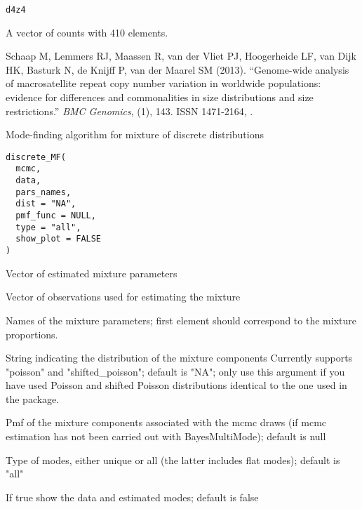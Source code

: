 \documentclass[a4paper]{book}
\begin{document}
%
\begin{Usage}
\begin{verbatim}
d4z4
\end{verbatim}
\end{Usage}
%
\begin{Format}
A vector of counts with 410 elements.
\end{Format}
%
\begin{References}\relax
Schaap M, Lemmers RJ, Maassen R, van der Vliet PJ, Hoogerheide LF, van Dijk HK, Basturk N, de Knijff P, van der Maarel SM (2013).
``Genome-wide analysis of macrosatellite repeat copy number variation in worldwide populations: evidence for differences and commonalities in size distributions and size restrictions.''
\emph{BMC Genomics}, (1), 143.
ISSN 1471-2164, .
\end{References}
%
\begin{Description}\relax
Mode-finding algorithm for mixture of discrete distributions
\end{Description}
%
\begin{Usage}
\begin{verbatim}
discrete_MF(
  mcmc,
  data,
  pars_names,
  dist = "NA",
  pmf_func = NULL,
  type = "all",
  show_plot = FALSE
)
\end{verbatim}
\end{Usage}
%
\begin{Arguments}
\begin{ldescription}
\item[\code{mcmc}] Vector of estimated mixture parameters

\item[\code{data}] Vector of observations used for estimating the mixture

\item[\code{pars\_names}] Names of the mixture parameters; first element should 
correspond to the mixture proportions.

\item[\code{dist}] String indicating the distribution of the mixture components
Currently supports "poisson" and "shifted\_poisson"; default is "NA"; only
use this argument if you have used Poisson and shifted Poisson distributions
identical to the one used in the package.

\item[\code{pmf\_func}] Pmf of the mixture components associated with the mcmc draws
(if mcmc estimation has not been carried out with BayesMultiMode); default is null

\item[\code{type}] Type of modes, either unique or all (the latter includes flat modes); default is "all"

\item[\code{show\_plot}] If true show the data and estimated modes; default is false
\end{ldescription}
\end{Arguments}
\end{document}
